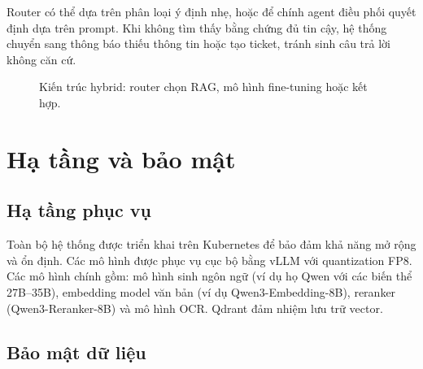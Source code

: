 Router có thể dựa trên phân loại ý định nhẹ, hoặc để chính agent điều phối quyết
định dựa trên prompt. Khi \rag{} không tìm thấy bằng chứng đủ tin cậy, hệ thống chuyển sang
thông báo thiếu thông tin hoặc tạo ticket, tránh sinh câu trả lời không căn cứ.

\begin{figure}[htbp]
\centering
{}
\caption{Kiến trúc hybrid: router chọn RAG, mô hình fine-tuning hoặc kết hợp.}
\label{fig:kien-truc-lai}
\end{figure}

\section{Hạ tầng và bảo mật}
\label{sec:hatang}

\subsection{Hạ tầng phục vụ}

Toàn bộ hệ thống được triển khai trên Kubernetes để bảo đảm khả năng mở rộng và ổn định.
Các mô hình được phục vụ cục bộ bằng vLLM với quantization FP8. Các mô hình chính gồm: mô
hình sinh ngôn ngữ (ví dụ họ Qwen với các biến thể 27B--35B), embedding model văn bản (ví dụ
Qwen3-Embedding-8B), reranker (Qwen3-Reranker-8B) và mô hình OCR. Qdrant đảm
nhiệm lưu trữ vector.

\subsection{Bảo mật dữ liệu}

